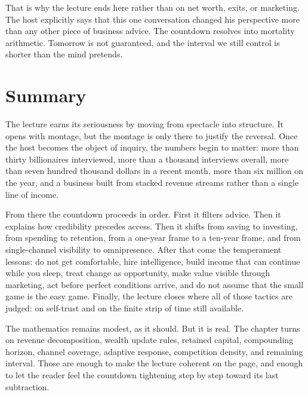 That is why the lecture ends here rather than on net worth, exits, or marketing. The host explicitly says that this one conversation changed his perspective more than any other piece of business advice. The countdown resolves into mortality arithmetic. Tomorrow is not guaranteed, and the interval we still control is shorter than the mind pretends.

\section{Summary}

The lecture earns its seriousness by moving from spectacle into structure. It opens with montage, but the montage is only there to justify the reversal. Once the host becomes the object of inquiry, the numbers begin to matter: more than thirty billionaires interviewed, more than a thousand interviews overall, more than seven hundred thousand dollars in a recent month, more than six million on the year, and a business built from stacked revenue streams rather than a single line of income.

From there the countdown proceeds in order. First it filters advice. Then it explains how credibility precedes access. Then it shifts from saving to investing, from spending to retention, from a one-year frame to a ten-year frame, and from single-channel visibility to omnipresence. After that come the temperament lessons: do not get comfortable, hire intelligence, build income that can continue while you sleep, treat change as opportunity, make value visible through marketing, act before perfect conditions arrive, and do not assume that the small game is the easy game. Finally, the lecture closes where all of those tactics are judged: on self-trust and on the finite strip of time still available.

The mathematics remains modest, as it should. But it is real. The chapter turns on revenue decomposition, wealth update rules, retained capital, compounding horizon, channel coverage, adaptive response, competition density, and remaining interval. Those are enough to make the lecture coherent on the page, and enough to let the reader feel the countdown tightening step by step toward its last subtraction.